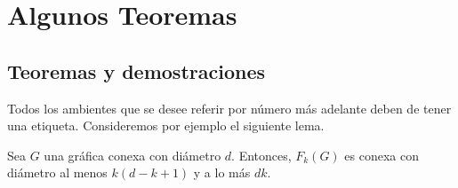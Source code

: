 \chapter{Algunos Teoremas}%
\label{cap:ejemplos}

\section{Teoremas y demostraciones}%
\label{sec:etiquetas}

Todos los ambientes que se desee referir por n\'umero m\'as adelante deben de
tener una etiqueta.  Consideremos por ejemplo el siguiente lema.

\begin{teorema}%
\label{teo:primero}
Sea $G$ una gr\'afica conexa con di\'ametro $d$. Entonces, $F_{k}(G)$ es 
conexa con di\'ametro al menos $k(d -k+1)$ y a lo m\'as $d k$.
\end{teorema}

